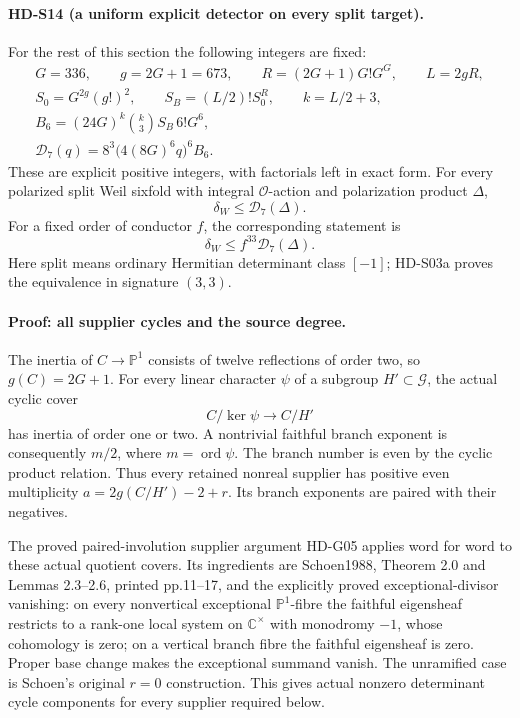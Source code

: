 \paragraph{HD-S14 (a uniform explicit detector on every split target).}
For the rest of this section the following integers are fixed:
\[
\begin{gathered}
 G=336,\qquad g=2G+1=673,\qquad
 R=(2G+1)G!G^G,\qquad L=2gR,\\
 S_0=G^{2g}(g!)^2,\qquad S_B=(L/2)!S_0^R,\qquad k=L/2+3,\\
 B_6=(24G)^k\binom{k}{3}S_B\,6!G^6,\\
 \boxed{\mathcal D_7(q)=
       8^3\bigl(4(8G)^6q\bigr)^6 B_6.}                   \tag{S14.1}
\end{gathered}
\]
These are explicit positive integers, with factorials left in exact
form. For every polarized split Weil sixfold with integral
\(\mathcal O\)-action and polarization product \(\Delta\),
\[
 \boxed{\delta_W\le\mathcal D_7(\Delta).}                  \tag{S14.2}
\]
For a fixed order of conductor \(f\), the corresponding statement is
\[
 \boxed{\delta_W\le f^{33}\mathcal D_7(\Delta).}            \tag{S14.3}
\]
Here split means ordinary Hermitian determinant class \([-1]\);
HD-S03a proves the equivalence in signature \((3,3)\).

\paragraph{Proof: all supplier cycles and the source degree.}
The inertia of \(C\to\mathbb P^1\) consists of twelve reflections
of order two, so \(g(C)=2G+1\). For every linear character
\(\psi\) of a subgroup \(H'\subset\mathcal G\), the actual cyclic
cover
\[
 C/\ker\psi\longrightarrow C/H'
\]
has inertia of order one or two. A nontrivial faithful branch
exponent is consequently \(m/2\), where \(m=\operatorname{ord}\psi\).
The branch number is even by the cyclic product relation. Thus
every retained nonreal supplier has positive even multiplicity
\(a=2g(C/H')-2+r\). Its branch exponents are paired with their
negatives.

The proved paired-involution supplier argument HD-G05 applies
word for word to these actual quotient covers. Its ingredients
are Schoen1988, Theorem 2.0 and Lemmas 2.3--2.6, printed
pp.11--17, and the explicitly proved exceptional-divisor vanishing:
on every nonvertical exceptional \(\mathbb P^1\)-fibre the faithful
eigensheaf restricts to a rank-one local system on
\(\mathbb C^\times\) with monodromy \(-1\), whose cohomology is
zero; on a vertical branch fibre the faithful eigensheaf is zero.
Proper base change makes the exceptional summand vanish. The
unramified case is Schoen's original \(r=0\) construction.
This gives actual nonzero determinant cycle components for every
supplier required below.

